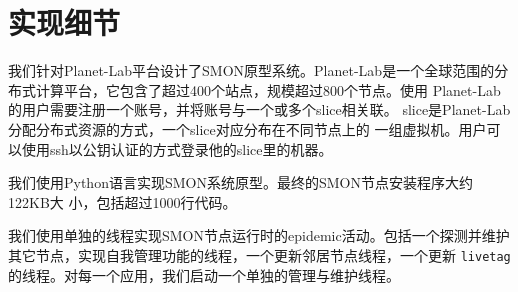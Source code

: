 \section{实现细节}
\label{sec:smon_impl}

我们针对Planet-Lab平台设计了SMON原型系统。Planet-Lab是一个全球范围的分
布式计算平台，它包含了超过400个站点，规模超过800个节点。使用
Planet-Lab的用户需要注册一个账号，并将账号与一个或多个slice相关联。
slice是Planet-Lab分配分布式资源的方式，一个slice对应分布在不同节点上的
一组虚拟机。用户可以使用ssh以公钥认证的方式登录他的slice里的机器。

我们使用Python语言实现SMON系统原型。最终的SMON节点安装程序大约122KB大
小，包括超过1000行代码。

我们使用单独的线程实现SMON节点运行时的epidemic活动。包括一个探测并维护
其它节点，实现自我管理功能的线程，一个更新邻居节点线程，一个更新
\texttt{livetag}的线程。对每一个应用，我们启动一个单独的管理与维护线程。


